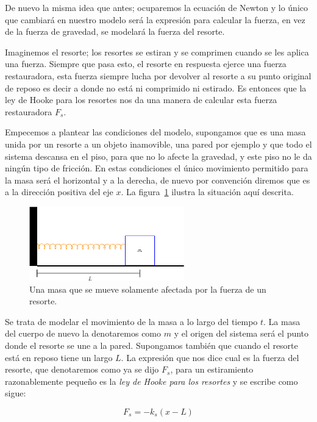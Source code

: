 De nuevo la misma idea que antes; ocuparemos la ecuación de Newton y lo único que cambiará en nuestro modelo será la expresión para calcular la fuerza, en vez de la fuerza de gravedad, se modelará la fuerza del resorte.

Imaginemos el resorte; los resortes se estiran y se comprimen cuando se les aplica una fuerza.
Siempre que pasa esto, el resorte en respuesta ejerce una fuerza restauradora, esta fuerza siempre lucha por devolver al resorte a su punto original de reposo es decir a donde no está ni comprimido ni estirado.
Es entonces que la ley de Hooke para los resortes nos da una manera de calcular esta fuerza restauradora $F_s$.

Empecemos a plantear las condiciones del modelo, supongamos que es una masa unida por un resorte a un objeto inamovible, una pared por ejemplo y que todo el sistema descansa en el piso, para que no lo afecte la gravedad, y este piso no le da ningún tipo de fricción.
En estas condiciones el único movimiento permitido para la masa será el horizontal y a la derecha, de nuevo por convención diremos que es a la dirección positiva del eje $x$.
La figura~\ref{masaResorte:fig} ilustra la situación aquí descrita.

\begin{figure}[htb]
 \centering
 \includegraphics[width=0.6\textwidth]{Img/masaResorte}
 \caption[Masa unida por un resorte]{ 
 Una masa que se mueve solamente afectada por la fuerza de un resorte.
 } \label{masaResorte:fig}
\end{figure}

Se trata de modelar el movimiento de la masa a lo largo del tiempo $t$.
La masa del cuerpo de nuevo la denotaremos como $m$ y el origen del sistema será el punto donde el resorte se une a la pared.
Supongamos también que cuando el resorte está en reposo tiene un largo $L$.
La expresión que nos dice cual es la fuerza del resorte, que denotaremos como ya se dijo $F_s$, para un estiramiento razonablemente pequeño es la \emph{ley de Hooke para los resortes} y se escribe como sigue:

\begin{equation}
F_s = -k_s \left( x - L \right)
\end{equation}

